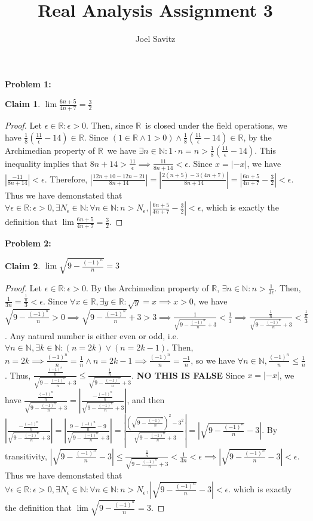 \documentclass{article}
\title{Real Analysis Assignment 3}
\author{Joel Savitz}
\newcommand{\reals}{\ensuremath{\mathbb{R}}}
\newcommand{\nats}{\ensuremath{\mathbb{N}}}
\newcommand{\eps}{\ensuremath{\epsilon}}
\newcommand{\neps}{\ensuremath{N_\epsilon}}
\newcommand{\overn}[1]{\ensuremath{\frac{#1}{n}}}
\newcommand{\movern}{\overn{(-1)^n}}
\newcommand{\bsn}{\sqrt{9-\movern}}
\newtheorem{clm}{Claim}
\begin{document}
\maketitle

\textbf{Problem 1:}

\begin{clm} \label{c1}
	$\lim \frac{6n+5}{4n+7} = \frac{3}{2}$
\end{clm}

\begin{proof}
	Let $\eps \in \reals : \eps > 0$.
	Then, since \reals\ is closed under the field operations,
	we have $\frac{1}{8}(\frac{11}{\eps} - 14) \in \reals$.
	Since $(1 \in \reals \land 1 > 0) \land \frac{1}{8}(\frac{11}{\eps} - 14) \in \reals$,
	by the Archimedian property of \reals\,
	we have $\exists n \in \nats: 1 \cdot n = n > \frac{1}{8}(\frac{11}{\eps} - 14)$.
	This inequality implies that $8n + 14 > \frac{11}{\eps} \implies \frac{11}{8n+14} < \eps$.
	Since $x = |-x|$, we have $|\frac{-11}{8n+14}| < \eps$.
	Therefore, $|\frac{12n + 10 - 12n - 21}{8n+14}| = |\frac{2(n+5) - 3(4n+7)}{8n+14}| =
	|\frac{6n+5}{4n+7} - \frac{3}{2}| < \eps$.
	Thus we have demonstated that $\forall \eps \in \reals : \eps > 0, \exists \neps \in \nats:
	\forall n \in \nats: n > \neps, |\frac{6n+5}{4n+7} - \frac{3}{2}| < \eps$,
	which is exactly the definition that
	$\lim \frac{6n+5}{4n+7} = \frac{3}{2}$.
\end{proof}

\textbf{Problem 2:}

\begin{clm} \label{c2}
	$\lim \sqrt{9-\frac{(-1)^n}{n}} = 3$
\end{clm}

\begin{proof}
	Let $\eps \in \reals: \eps > 0$.
	By the Archimedian property of \reals,
	$\exists n \in \nats: n > \frac{1}{3\eps}$.
	Then, $\frac{1}{3n} = \frac{\overn{1}}{3}< \eps$.
	Since $\forall x \in \reals, \exists y \in \reals: \sqrt{y}=x \implies x > 0$,
	we have $\bsn > 0 \implies \bsn + 3 > 3 \implies \frac{1}{\bsn + 3} < \frac{1}{3}
	\implies \frac{\overn{1}}{\bsn + 3} < \frac{\overn{1}}{3}$.
	Any natural number is either even or odd, i.e.
	$\forall n \in \nats, \exists k \in \nats: (n = 2k) \lor (n = 2k-1)$.
	Then, $n = 2k \implies \movern = \overn{1} \land n = 2k-1 \implies \movern = \overn{-1}$,
	so we have $\forall n \in \nats, \movern \le \overn{1}$.
	Thus, $\frac{\movern}{\bsn + 3} \le \frac{\overn{1}}{\bsn + 3}$.
	\textbf{NO THIS IS FALSE}
	Since $x = |-x|$, we have $\frac{\movern}{\bsn + 3} = |\frac{-\movern}{\bsn + 3}|$,
	and then $|\frac{-\movern}{\bsn + 3}| = |\frac{9-\movern-9}{\bsn + 3}| =
	|\frac{(\bsn)^2-3^2}{\bsn + 3}| = |\bsn - 3|$.
	By transitivity, $|\bsn - 3| \le \frac{\overn{1}}{\bsn + 3} < \frac{1}{3n} < \eps
	\implies |\bsn - 3| < \eps$.
	Thus we have demonstated that $\forall \eps \in \reals : \eps > 0, \exists \neps \in \nats:
	\forall n \in \nats: n > \neps,
	|\bsn - 3| < \eps$.
	which is exactly the definition that
	$\lim \sqrt{9-\frac{(-1)^n}{n}} = 3$.
\end{proof}
\end{document}
